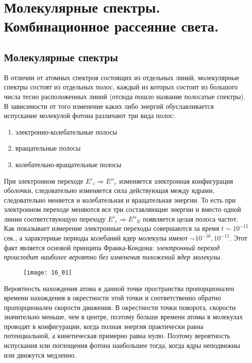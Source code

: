 \chapter{Молекулярные спектры. Комбинационное рассеяние света.}

\section{Молекулярные спектры}
В отличии от атомных спектров состоящих из отдельных линий, молекулярные 
спектры состоят из отдельных полос, каждый из которых состоит из большого 
числа тесно расположенных линий (отсюда пошло название полосатые спектры). 
В зависимости от того изменение каких либо энергий обуславливается 
испускание молекулой фотона различают три вида полос:
\begin{enumerate}
    \item электронно-колебательные полосы
    \item вращательные полосы
    \item колебательно-вращательные полосы
\end{enumerate}

При электронном переходе \( E'_e \Rightarrow E''_e \) изменяется 
электронная конфигурация оболочки, следовательно изменяется сила 
действующая между ядрами, следовательно меняется и колебательная и 
вращательная энергии. То есть при электронном переходе меняются все три 
составляющие энергии и вместо одной линии соответствующую переходу 
\( E'_e \Rightarrow E''_E \) появляется целая полоса частот. Как 
показывает измерение электронные переходы совершаются за время 
\( t \sim 10^{-15} \) сек., а характерные периоды колебаний ядер молекулы 
имеют \( \sim 10^{-10}, 10^{-15} \). Этот факт является основой принципа 
Франка-Кондона: \emph{электронный переход происходит наиболее вероятно без 
изменения положений ядер молекулы.} 

\begin{figure}[h!]
    \center
    \texttt{[image: 16\_01]}
\end{figure}

Вероятность нахождения атома в данной точке пространства пропорционален 
времени нахождения в окрестности этой точки и соответственно обратно 
пропорционален скорости движения. В окрестности точки поворота, скорости 
значительно меньше, чем в центре, поэтому больше времени атомы в молекулах 
проводят в конфигурации, когда полная энергия практически равна 
потенциальной, а кинетическая примерно равна нулю. Поэтому вероятность 
испускания или поглощения фотона наибольшее тогда, когда ядры неподвижны 
или движутся медленно.

